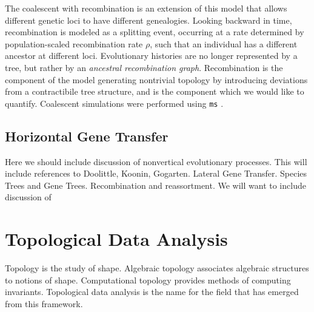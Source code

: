 The coalescent with recombination is an extension of this model that allows different genetic loci to have different genealogies.
Looking backward in time, recombination is modeled as a splitting event, occurring at a rate determined by population-scaled recombination rate $\rho$, such that an individual has a different ancestor at different loci.
Evolutionary histories are no longer represented by a tree, but rather by an \emph{ancestral recombination graph}.
Recombination is the component of the model generating nontrivial topology by introducing deviations from a contractibile tree structure, and is the component which we would like to quantify.
Coalescent simulations were performed using \texttt{ms} \cite{Hudson:2002}.


\subsection{Horizontal Gene Transfer}

Here we should include discussion of nonvertical evolutionary processes.
This will include references to Doolittle, Koonin, Gogarten.
Lateral Gene Transfer.
Species Trees and Gene Trees.
Recombination and reassortment.
We will want to include discussion of 

\section{Topological Data Analysis}

Topology is the study of shape.
Algebraic topology associates algebraic structures to notions of shape.
Computational topology provides methods of computing invariants.
Topological data analysis is the name for the field that has emerged from this framework.


